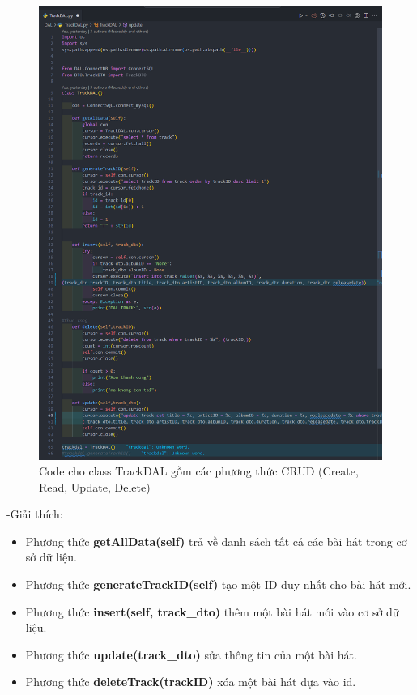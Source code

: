 \documentclass[a4paper]{article}
\begin{document}
\clearpage
\newpage
\begin{figure}[h]
	\centering
	\includegraphics[width=\textwidth]{images/trackDAl.png}
	\caption{Code cho class TrackDAL gồm các phương thức CRUD (Create, Read, Update, Delete)}
\end{figure}
\clearpage
\newpage
\begin{flushleft}
	-Giải thích:
	\begin{itemize}
		\item Phương thức \textbf{getAllData(self)} trả về danh sách tất cả các bài hát trong cơ sở dữ liệu.

		\item Phương thức \textbf{generateTrackID(self)} tạo một ID duy nhất cho bài hát mới.

		\item Phương thức \textbf{insert(self, track\_dto)} thêm một bài hát mới vào cơ sở dữ liệu.

		\item Phương thức \textbf{update(track\_dto)} sửa thông tin của một bài hát.

		\item Phương thức \textbf{deleteTrack(trackID)} xóa một bài hát dựa vào id.

	\end{itemize}
\end{flushleft}
\clearpage
\end{document}
